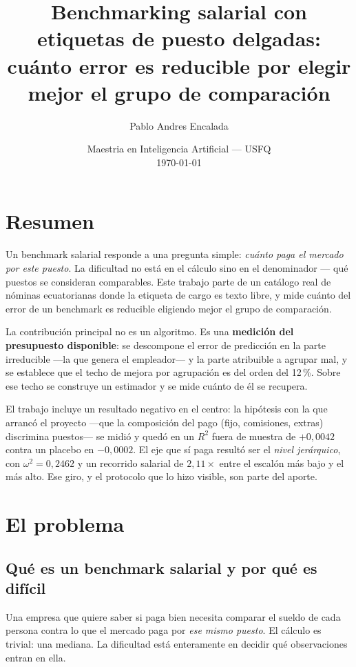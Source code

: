 \documentclass[12pt,a4paper]{report}
\title{\bfseries Benchmarking salarial con etiquetas de puesto delgadas:\\
       cuánto error es reducible por elegir mejor el grupo de comparación}
\author{Pablo Andres Encalada}
\date{Maestria en Inteligencia Artificial --- USFQ\\[1ex]\today}
\begin{document}
\maketitle

\chapter*{Resumen}

Un benchmark salarial responde a una pregunta simple: \emph{cuánto paga el mercado
por este puesto}. La dificultad no está en el cálculo sino en el denominador ---
qué puestos se consideran comparables. Este trabajo parte de un catálogo real de
nóminas ecuatorianas donde la etiqueta de cargo es texto libre, y mide cuánto del
error de un benchmark es reducible eligiendo mejor el grupo de comparación.

La contribución principal no es un algoritmo. Es una \textbf{medición del
presupuesto disponible}: se descompone el error de predicción en la parte
irreducible ---la que genera el empleador--- y la parte atribuible a agrupar mal,
y se establece que el techo de mejora por agrupación es del orden del 12\,\%.
Sobre ese techo se construye un estimador y se mide cuánto de él se recupera.

El trabajo incluye un resultado negativo en el centro: la hipótesis con la que
arrancó el proyecto ---que la composición del pago (fijo, comisiones, extras)
discrimina puestos--- se midió y quedó en un $R^2$ fuera de muestra de $+0{,}0042$
contra un placebo en $-0{,}0002$. El eje que sí paga resultó ser el \emph{nivel
jerárquico}, con $\omega^2 = 0{,}2462$ y un recorrido salarial de $2{,}11\times$
entre el escalón más bajo y el más alto. Ese giro, y el protocolo que lo hizo
visible, son parte del aporte.

\tableofcontents

\chapter{El problema}

\section{Qué es un benchmark salarial y por qué es difícil}

Una empresa que quiere saber si paga bien necesita comparar el sueldo de cada
persona contra lo que el mercado paga por \emph{ese mismo puesto}. El cálculo es
trivial: una mediana. La dificultad está enteramente en decidir qué observaciones
entran en ella.
\end{document}
